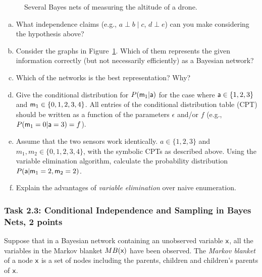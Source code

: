 \documentclass[12pt,a4paper,oneside]{article}
\begin{document}
\begin{figure}[ht]
{  }
  \caption{Several Bayes nets of measuring the altitude of a drone.}
  \label{fig:altitude}
\end{figure}

\begin{enumerate}[a)]
\item What independence claims (e.g., $a \perp b \; | \; c$, $d \perp e$) can
  you make considering the hypothesis above?
\item Consider the graphs in Figure~\ref{fig:altitude}. Which of them
  represents the given information correctly (but not necessarily efficiently)
  as a Bayesian network?
\item Which of the networks is the best representation? Why?
\item Give the conditional distribution for $P(\rv{m}_1|\rv{a})$ for the case
  where $\rv{a}\in\{1,2,3\}$ and $\rv{m}_1\in\{0,1,2,3,4\}$. All entries of the
  conditional distribution table (CPT) should be written as a function of the
  parameters $\epsilon$ and/or $f$ (e.g., $P(\rv{m}_1=0|\rv{a}=3)=f$).
\item Assume that the two sensors work identically. $a \in \{1, 2, 3\}$ and
  $m_1, m_2 \in \{0, 1, 2, 3, 4\}$, with the symbolic CPTs as described
  above. Using the variable elimination algorithm, calculate the probability
  distribution $P(\rv{a} | \rv{m}_1 = 2, \rv{m}_2 = 2)$.
\item Explain the advantages of \emph{variable elimination} over naive
  enumeration.
\end{enumerate}


%
%
\subsubsection*{Task 2.3: Conditional Independence and Sampling in Bayes Nets, 2 points}
Suppose that in a Bayesian network containing an unobserved variable $\rv{x}$,
all the variables in the Markov blanket $MB(\rv{x})$ have been observed.
%
The \emph{Markov blanket} of a node $\rv{x}$ is a set of nodes including the
parents, children and children's parents of $\rv{x}$.
\end{document}
